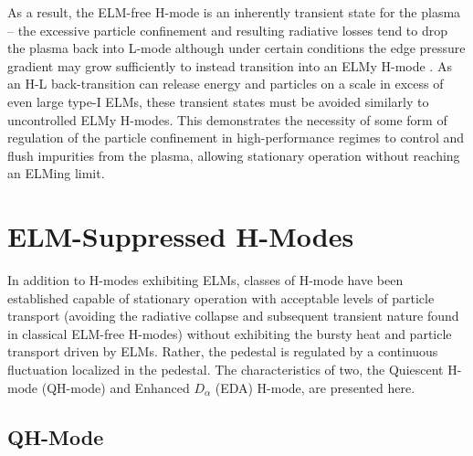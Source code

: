 As a result, the ELM-free H-mode is an inherently transient state for the plasma -- the excessive particle confinement and resulting radiative losses tend to drop the plasma back into L-mode although under certain conditions the edge pressure gradient may grow sufficiently to instead transition into an ELMy H-mode \cite{Breger1998}.  As an H-L back-transition can release energy and particles on a scale in excess of even large type-I ELMs, these transient states must be avoided similarly to uncontrolled ELMy H-modes.  This demonstrates the necessity of some form of regulation of the particle confinement in high-performance regimes to control and flush impurities from the plasma, allowing stationary operation without reaching an ELMing limit.\nicesectionending

\section{ELM-Suppressed H-Modes}\label{sec:hcr_elmsuppressed}

In addition to H-modes exhibiting ELMs, classes of H-mode have been established capable of stationary operation with acceptable levels of particle transport (avoiding the radiative collapse and subsequent transient nature found in classical ELM-free H-modes) without exhibiting the bursty heat and particle transport driven by ELMs.  Rather, the pedestal is regulated by a continuous fluctuation localized in the pedestal.  The characteristics of two, the Quiescent H-mode (QH-mode) and Enhanced $D_\alpha$ (EDA) H-mode, are presented here.

\subsection{QH-Mode}\label{subsec:hcr_qh}


